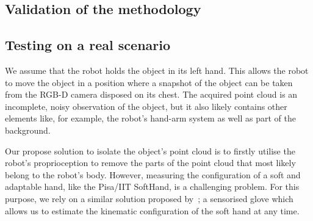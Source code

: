 \subsection{Validation of the methodology}

\subsection{Testing on a real scenario}
\label{sec:real}


We assume that the robot holds the object in its left hand. This allows the robot to move the object in a position where a snapshot of the object can be taken from the RGB-D camera disposed on its chest. 
The acquired point cloud is an incomplete, noisy observation of the object, but it also likely contains other elements like, for example, the robot's hand-arm system as well as part of the background. 

Our propose solution to isolate the object's point cloud is to firstly utilise the robot's proprioception to remove the parts of the point cloud that most likely belong to the robot's body. However, measuring  the  configuration of  a  soft and  adaptable hand, like the Pisa/IIT SoftHand, is a challenging problem. For this purpose, we rely on a similar solution proposed by~\citet{Santaera2015Lowcost}; a sensorised glove which allows us to estimate the kinematic configuration of the soft hand at any time.

